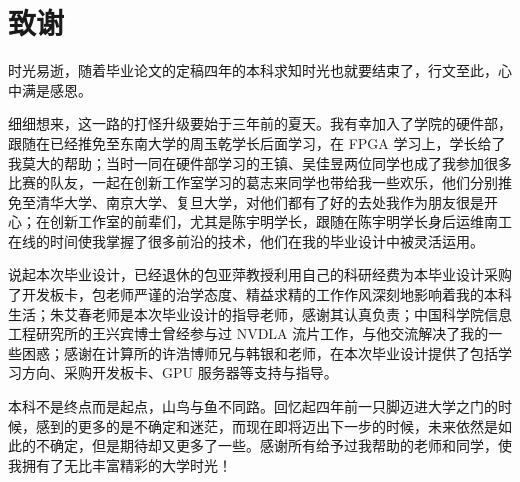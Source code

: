\chapter[致谢]{致\quad 谢}%
\thispagestyle{noheaderstyle}%

时光易逝，随着毕业论文的定稿四年的本科求知时光也就要结束了，行文至此，心中满是感恩。

细细想来，这一路的打怪升级要始于三年前的夏天。我有幸加入了学院的硬件部，跟随在已经推免至东南大学的周玉乾学长后面学习，在 FPGA 学习上，学长给了我莫大的帮助；当时一同在硬件部学习的王镇、吴佳昱两位同学也成了我参加很多比赛的队友，一起在创新工作室学习的葛志来同学也带给我一些欢乐，他们分别推免至清华大学、南京大学、复旦大学，对他们都有了好的去处我作为朋友很是开心；在创新工作室的前辈们，尤其是陈宇明学长，跟随在陈宇明学长身后运维南工在线的时间使我掌握了很多前沿的技术，他们在我的毕业设计中被灵活运用。

说起本次毕业设计，已经退休的包亚萍教授利用自己的科研经费为本毕业设计采购了开发板卡，包老师严谨的治学态度、精益求精的工作作风深刻地影响着我的本科生活；朱艾春老师是本次毕业设计的指导老师，感谢其认真负责；中国科学院信息工程研究所的王兴宾博士曾经参与过 NVDLA 流片工作，与他交流解决了我的一些困惑；感谢在计算所的许浩博师兄与韩银和老师，在本次毕业设计提供了包括学习方向、采购开发板卡、GPU 服务器等支持与指导。

本科不是终点而是起点，山鸟与鱼不同路。回忆起四年前一只脚迈进大学之门的时候，感到的更多的是不确定和迷茫，而现在即将迈出下一步的时候，未来依然是如此的不确定，但是期待却又更多了一些。感谢所有给予过我帮助的老师和同学，使我拥有了无比丰富精彩的大学时光！

\cleardoublepage[plain]%
